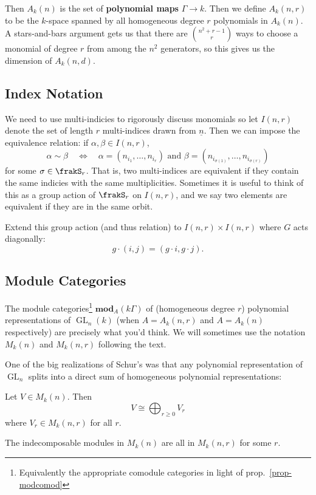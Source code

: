 \documentclass[12pt]{article}
\DeclareMathOperator{\1}{\mathbbm{1}}
\DeclareMathOperator{\GL}{GL}
\begin{document}
Then $A_k(n)$ is the set of \textbf{polynomial maps} $\Gamma\to k$. Then we define $A_k(n,r)$ to be the $k$-space spanned by all homogeneous degree $r$ 
polynomials in $A_k(n)$. A stars-and-bars argument gets us that there are $\binom{n^2+r-1}{r}$ ways to choose a monomial of degree $r$ from among the $n^2$ generators,
so this gives us the dimension of $A_k(n,d)$.

\subsection{Index Notation}
\label{subsec:index}
We need to use multi-indicies to rigorously discuss monomials so let $I(n,r)$ denote the set of length $r$ multi-indices drawn from $\underline n$. Then 
we can impose the equivalence relation: if $\alpha,\beta\in I(n,r)$,
\[\alpha\sim\beta \quad\Leftrightarrow\quad \alpha=(n_{i_1},\dots,n_{i_r})\text{ and } \beta=(n_{i_{\sigma(1)}},\dots, n_{i_{\sigma(r)}})\]
for some $\sigma\in\frakS_r$. That is, two multi-indices are equivalent if they contain the same indicies with the same multiplicities. Sometimes it is useful to think 
of this as a group action of $\frakS_r$ on $I(n,r)$, and we say two elements are equivalent if they are in the same orbit.

Extend this group action (and thus relation) to $I(n,r)\times I(n,r)$ where $G$ acts diagonally:
\[g\cdot(i,j)=(g\cdot i,g\cdot j).\]

\subsection{Module Categories}
The module categories\footnote{Equivalently the appropriate comodule categories in light of prop.~\ref{prop-modcomod}} $\mathbf{mod}_{A}(k\Gamma)$ of 
(homogeneous degree $r$) polynomial representations of $\GL_n(k)$ (when $A=A_k(n,r)$ and $A=A_k(n)$ respectively) are precisely what you'd think. We will sometimes 
use the notation $M_k(n)$ and $M_k(n,r)$ following the text.

One of the big realizations of Schur's was that any polynomial representation of $\GL_n$ splits into a direct sum of homogeneous polynomial representations:
\begin{thm}
	Let $V\in M_k(n)$. Then 
	\[V\cong \bigoplus_{r\ge 0} V_r\]
	where $V_r\in M_k(n,r)$ for all $r$.
\end{thm}
\begin{cor}
	The indecomposable modules in $M_k(n)$ are all in $M_k(n,r)$ for some $r$.
\end{cor}
\end{document}
